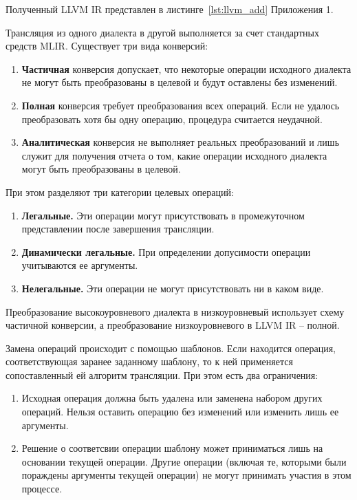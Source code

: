 Полученный LLVM IR представлен в листинге~\ref{lst:llvm_add} Приложения 1.

Трансляция из одного диалекта в другой выполняется за счет стандартных средств
MLIR. Существует три вида конверсий:

\begin{enumerate}
  \item \textbf{Частичная} конверсия допускает, что некоторые операции исходного
  диалекта не могут быть преобразованы в целевой и будут оставлены без изменений.
  \item \textbf{Полная} конверсия требует преобразования всех операций. Если
  не удалось преобразовать хотя бы одну операцию, процедура считается неудачной.
  \item \textbf{Аналитическая} конверсия не выполняет реальных преобразований
  и лишь служит для получения отчета о том, какие операции исходного диалекта
  могут быть преобразованы в целевой.
\end{enumerate}
При этом разделяют три категории целевых операций:
\begin{enumerate}
  \item \textbf{Легальные.} Эти операции могут присутствовать в промежуточном
  представлении после завершения трансляции.
  \item \textbf{Динамически легальные.} При определении допусимости операции
  учитываются ее аргументы.
  \item \textbf{Нелегальные.} Эти операции не могут присутствовать ни в каком
  виде.
\end{enumerate}

Преобразование высокоуровневого диалекта в низкоуровневый использует схему
частичной конверсии, а преобразование низкоуровневого в LLVM IR -- полной.

Замена операций происходит с помощью шаблонов. Если находится операция,
соответствующая заранее заданному шаблону, то к ней применяется сопоставленный
ей алгоритм трансляции. При этом есть два ограничения:
\begin{enumerate}
  \item Исходная операция должна быть удалена или заменена набором других
  операций. Нельзя оставить операцию без изменений или изменить лишь ее аргументы.
  \item Решение о соответсвии операции шаблону может приниматься лишь на основании
  текущей операции. Другие операции (включая те, которыми были пораждены
  аргументы текущей операции) не могут принимать участия в этом процессе.
\end{enumerate}

